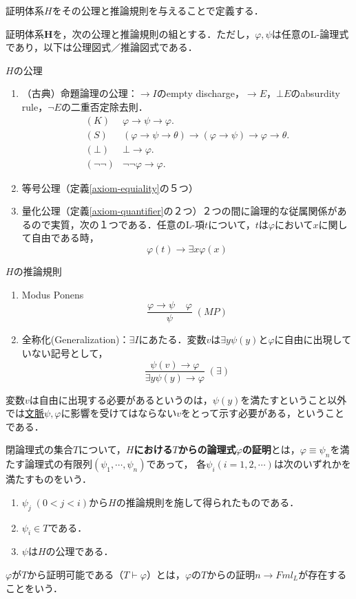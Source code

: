 \documentclass[uplatex, 12pt, dvipdfmx]{jsreport}
\begin{document}
証明体系$H$をその公理と推論規則を与えることで定義する．
\begin{definition}
    証明体系$\mathbf{H}$を，次の公理と推論規則の組とする．ただし，$\varphi,\psi$は任意のL-論理式であり，以下は公理図式／推論図式である．

    $H$の公理
    \begin{enumerate}
        \item （古典）命題論理の公理：$\to I$のempty discharge，$\to E$，$\bot E$のabsurdity rule，$\lnot E$の二重否定除去則．
        \begin{align*}
            (K) &\varphi\to\psi\to\varphi.\\
            (S) &(\varphi\to\psi\to\theta)\to(\varphi\to\psi)\to\varphi\to\theta.\\
            (\bot) &\bot\to\varphi.\\
            (\lnot\lnot) &\lnot\lnot\varphi\to\varphi.
        \end{align*}
        \item 等号公理（定義\ref{axiom-equiality}の５つ）
        \item 量化公理（定義\ref{axiom-quantifier}の２つ）２つの間に論理的な従属関係があるので実質，次の１つである．任意のL-項$t$について，$t$は$\varphi$において$x$に関して自由である時，
        \[\varphi(t)\to\exists x\varphi(x)\]
    \end{enumerate}

    $H$の推論規則
    \begin{enumerate}
        \item Modus Ponens
        \[ \frac{\varphi\to\psi\;\;\;\;\varphi}{\psi}\;(MP) \]
        \item 全称化(Generalization)：$\exists I$にあたる．変数$v$は$\exists y\psi(y)$と$\varphi$に自由に出現していない記号として，
        \[\frac{\psi(v)\to\varphi}{\exists y\psi(y)\to\varphi}\;(\exists)\]
    \end{enumerate}
    変数$v$は自由に出現する必要があるというのは，$\psi(y)$を満たすということ以外では\underline{文脈}$\psi,\varphi$に影響を受けてはならない$v$をとって示す必要がある，ということである．
\end{definition}

\begin{definition}[H-proof]
    閉論理式の集合$T$について，\textbf{$H$における$T$からの論理式$\varphi$の証明}とは，$\varphi\equiv\psi_n$を満たす論理式の有限列$(\psi_1,\cdots,\psi_n)$であって，
    各$\psi_i(i=1,2,\cdots)$は次のいずれかを満たすものをいう．
    \begin{enumerate}
        \item $\psi_j\;(0<j<i)$から$H$の推論規則を施して得られたものである．
        \item $\psi_i\in T$である．
        \item $\psi$は$H$の公理である．
    \end{enumerate}
\end{definition}
\begin{definition}[provable]
    $\varphi$が$T$から証明可能である（$T\vdash\varphi$）とは，$\varphi$の$T$からの証明$n\to Fml_L$が存在することをいう．
\end{definition}
\end{document}
